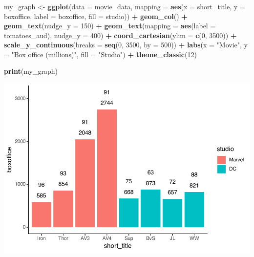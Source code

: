 \documentclass[
]{krantz}
\makeatletter
\newenvironment{Shaded}{\begin{snugshade}}{\end{snugshade}}
\newcommand{\DataTypeTok}[1]{\textcolor[rgb]{0.27,0.27,0.27}{#1}}
\newcommand{\DecValTok}[1]{\textcolor[rgb]{0.06,0.06,0.06}{#1}}
\newcommand{\KeywordTok}[1]{\textcolor[rgb]{0.27,0.27,0.27}{\textbf{#1}}}
\newcommand{\NormalTok}[1]{#1}
\newcommand{\OperatorTok}[1]{\textcolor[rgb]{0.43,0.43,0.43}{\textbf{#1}}}
\newcommand{\StringTok}[1]{\textcolor[rgb]{0.5,0.5,0.5}{#1}}
\newenvironment{kframe}{%
\medskip{}
\setlength{\fboxsep}{.8em}
 \def\at@end@of@kframe{}%
 \ifinner\ifhmode%
  \def\at@end@of@kframe{\end{minipage}}%
  \begin{minipage}{\columnwidth}%
 \fi\fi%
 \def\FrameCommand##1{\hskip\@totalleftmargin \hskip-\fboxsep
 \colorbox{shadecolor}{##1}\hskip-\fboxsep
     \hskip-\linewidth \hskip-\@totalleftmargin \hskip\columnwidth}%
 \MakeFramed {\advance\hsize-\width
   \@totalleftmargin\z@ \linewidth\hsize
   \@setminipage}}%
 {\par\unskip\endMakeFramed%
 \at@end@of@kframe}
\renewenvironment{Shaded}{\begin{kframe}}{\end{kframe}}
\makeatother
\begin{document}
\begin{Shaded}
\begin{Highlighting}[]
\NormalTok{my_graph <-}\StringTok{ }\KeywordTok{ggplot}\NormalTok{(}\DataTypeTok{data =}\NormalTok{ movie_data,}
           \DataTypeTok{mapping =} \KeywordTok{aes}\NormalTok{(}\DataTypeTok{x =}\NormalTok{ short_title,}
                         \DataTypeTok{y =}\NormalTok{ boxoffice,}
                         \DataTypeTok{label =}\NormalTok{ boxoffice, }
                         \DataTypeTok{fill =}\NormalTok{ studio)) }\OperatorTok{+}
\StringTok{  }\KeywordTok{geom_col}\NormalTok{() }\OperatorTok{+}
\StringTok{  }\KeywordTok{geom_text}\NormalTok{(}\DataTypeTok{nudge_y =} \DecValTok{150}\NormalTok{)  }\OperatorTok{+}
\StringTok{  }\KeywordTok{geom_text}\NormalTok{(}\DataTypeTok{mapping =} \KeywordTok{aes}\NormalTok{(}\DataTypeTok{label =}\NormalTok{ tomatoes_aud), }
            \DataTypeTok{nudge_y =} \DecValTok{400}\NormalTok{) }\OperatorTok{+}
\StringTok{  }\KeywordTok{coord_cartesian}\NormalTok{(}\DataTypeTok{ylim =} \KeywordTok{c}\NormalTok{(}\DecValTok{0}\NormalTok{, }\DecValTok{3500}\NormalTok{)) }\OperatorTok{+}
\StringTok{  }\KeywordTok{scale_y_continuous}\NormalTok{(}\DataTypeTok{breaks =} \KeywordTok{seq}\NormalTok{(}\DecValTok{0}\NormalTok{, }\DecValTok{3500}\NormalTok{, }\DataTypeTok{by =} \DecValTok{500}\NormalTok{)) }\OperatorTok{+}
\StringTok{  }\KeywordTok{labs}\NormalTok{(}\DataTypeTok{x =} \StringTok{"Movie"}\NormalTok{,}
       \DataTypeTok{y =} \StringTok{"Box office (millions)"}\NormalTok{,}
       \DataTypeTok{fill =} \StringTok{"Studio"}\NormalTok{) }\OperatorTok{+}
\StringTok{  }\KeywordTok{theme_classic}\NormalTok{(}\DecValTok{12}\NormalTok{)}

\KeywordTok{print}\NormalTok{(my_graph)}
\end{Highlighting}
\end{Shaded}

\includegraphics[width=0.65\linewidth]{bookdown_files/figure-latex/unnamed-chunk-121-1}
\end{document}
